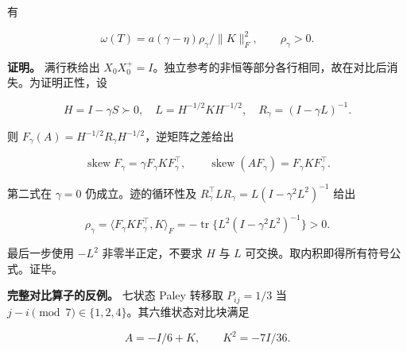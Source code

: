 \documentclass[11pt,a4paper]{article}
\begin{document}
\par
\noindent\begin{minipage}{\linewidth}

有

\[
\omega(T)=a(\gamma-\eta)\rho_\gamma/\|K\|_F^2,
\qquad\rho_\gamma>0.
\]

\end{minipage}\par

\par
\noindent\begin{minipage}{\linewidth}

\textbf{证明。} 满行秩给出
\(X_0X_0^+=I\)。独立参考的非恒等部分各行相同，故在对比后消失。为证明正性，设

\[
H=I-\gamma S\succ0,\quad L=H^{-1/2}KH^{-1/2},\quad R_\gamma=(I-\gamma L)^{-1}.
\]

\end{minipage}\par

\par
\noindent\begin{minipage}{\linewidth}

则 \(F_\gamma(A)=H^{-1/2}R_\gamma H^{-1/2}\)，逆矩阵之差给出

\[
\operatorname{skew}F_\gamma=\gamma F_\gamma K F_\gamma^\top,
\qquad
\operatorname{skew}(AF_\gamma)=F_\gamma K F_\gamma^\top.
\]

\end{minipage}\par

\par
\noindent\begin{minipage}{\linewidth}

第二式在 \(\gamma=0\) 仍成立。迹的循环性及
\(R_\gamma^\top L R_\gamma=L(I-\gamma^2L^2)^{-1}\) 给出

\[
\rho_\gamma=\langle F_\gamma K F_\gamma^\top,K\rangle_F
=-\operatorname{tr}\{L^2(I-\gamma^2L^2)^{-1}\}>0.
\]

\end{minipage}\par

最后一步使用 \(-L^2\) 非零半正定，不要求 \(H\) 与 \(L\)
可交换。取内积即得所有符号公式。证毕。

\par
\noindent\begin{minipage}{\linewidth}

\textbf{完整对比算子的反例。} 七状态 Paley 转移取 \(P_{ij}=1/3\) 当
\(j-i\pmod7\in\{1,2,4\}\)。其六维状态对比块满足

\[
A=-I/6+K,\qquad K^2=-7I/36.
\]

\end{minipage}\par
\end{document}
